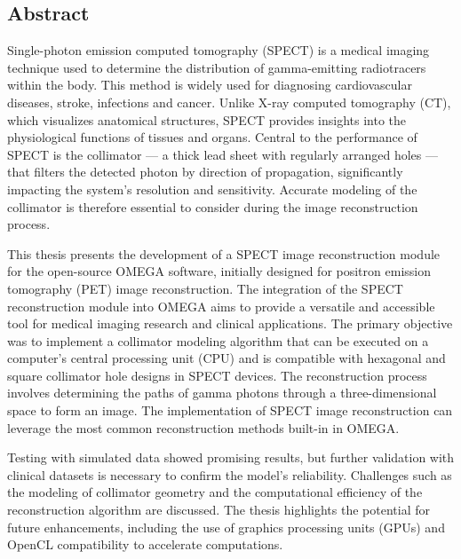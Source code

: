 \begin{titlepage}
    \section*{Abstract}
    Single-photon emission computed tomography (SPECT) is a medical imaging technique used to determine the distribution of gamma-emitting radiotracers within the body. This method is widely used for diagnosing cardiovascular diseases, stroke, infections and cancer. Unlike X-ray computed tomography (CT), which visualizes anatomical structures, SPECT provides insights into the physiological functions of tissues and organs. Central to the performance of SPECT is the collimator --- a thick lead sheet with regularly arranged holes --- that filters the detected photon by direction of propagation, significantly impacting the system's resolution and sensitivity. Accurate modeling of the collimator is therefore essential to consider during the image reconstruction process.

    This thesis presents the development of a SPECT image reconstruction module for the open-source OMEGA software, initially designed for positron emission tomography (PET) image reconstruction. The integration of the SPECT reconstruction module into OMEGA aims to provide a versatile and accessible tool for medical imaging research and clinical applications. The primary objective was to implement a collimator modeling algorithm that can be executed on a computer's central processing unit (CPU) and is compatible with hexagonal and square collimator hole designs in SPECT devices. The reconstruction process involves determining the paths of gamma photons through a three-dimensional space to form an image. The implementation of SPECT image reconstruction can leverage the most common reconstruction methods built-in in OMEGA.

    Testing with simulated data showed promising results, but further validation with clinical datasets is necessary to confirm the model's reliability. Challenges such as the modeling of collimator geometry and the computational efficiency of the reconstruction algorithm are discussed. The thesis highlights the potential for future enhancements, including the use of graphics processing units (GPUs) and OpenCL compatibility to accelerate computations.
\end{titlepage}